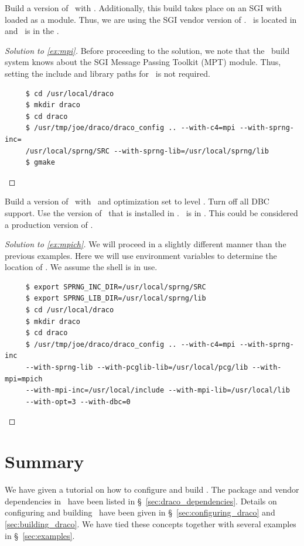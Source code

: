 \begin{cexa}
  \label{ex:mpi}
  Build a version of \draco\ with \mpi.  Additionally, this build
  takes place on an SGI with  loaded as a module.
  Thus, we are using the SGI vendor version of \mpi.  \sprng\ is
  located in  and \pcglib\ is in the \ldlib.
\end{cexa}
\begin{proof}[Solution to \ref{ex:mpi}]
  Before proceeding to the solution, we note that the \draco\ build
  system knows about the SGI Message Passing Toolkit (MPT) module.
  Thus, setting the include and library paths for \mpi\ is not
  required.
\begin{verbatim}
     $ cd /usr/local/draco
     $ mkdir draco
     $ cd draco
     $ /usr/tmp/joe/draco/draco_config .. --with-c4=mpi --with-sprng-inc=
     /usr/local/sprng/SRC --with-sprng-lib=/usr/local/sprng/lib
     $ gmake
\end{verbatim} %
\end{proof}

\begin{cexa}
  \label{ex:mpich}
  Build a version of \draco\ with \mpi\ and optimization set to level
  .  Turn off all DBC support.  Use the  version of
  \mpi\ that is installed in . \pcglib\ is in
  .  This could be considered a production
  version of \draco.
\end{cexa}
\begin{proof}[Solution to \ref{ex:mpich}]
  We will proceed in a slightly different manner than the previous
  examples.  Here we will use environment variables to determine the
  location of \sprng.  We assume the  shell is in use.
\begin{verbatim}
     $ export SPRNG_INC_DIR=/usr/local/sprng/SRC
     $ export SPRNG_LIB_DIR=/usr/local/sprng/lib
     $ cd /usr/local/draco
     $ mkdir draco
     $ cd draco
     $ /usr/tmp/joe/draco/draco_config .. --with-c4=mpi --with-sprng-inc
     --with-sprng-lib --with-pcglib-lib=/usr/local/pcg/lib --with-mpi=mpich
     --with-mpi-inc=/usr/local/include --with-mpi-lib=/usr/local/lib 
     --with-opt=3 --with-dbc=0
\end{verbatim}
\end{proof}


\section{Summary}

We have given a tutorial on how to configure and build \draco.  The
package and vendor dependencies in \draco\ have been listed in
\S~\ref{sec:draco_dependencies}.  Details on configuring and
building \draco\ have been given in \S~\ref{sec:configuring_draco} and 
\ref{sec:building_draco}.  We have tied these concepts together with
several examples in \S~\ref{sec:examples}.
